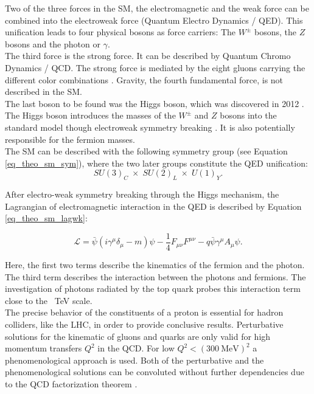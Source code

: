 Two of the three forces in the SM, the electromagnetic and the weak force can be combined into the electroweak force (Quantum Electro Dynamics / QED). This unification leads to four physical bosons as force carriers: The $W^\pm$ bosons, the $Z$ bosons and the photon or $\gamma$. \\
The third force is the strong force. It can be described by Quantum Chromo Dynamics / QCD. The strong force is mediated by the eight gluons carrying the different color combinations \cite{Politzer:1974fr}. Gravity, the fourth fundamental force, is not described in the SM.\\ 
The last boson to be found was the Higgs boson, which was discovered in 2012 \cite{Aad:2012tfa,Chatrchyan:2012ufa}. The Higgs boson introduces the masses of the $W^\pm$ and $Z$ bosons into the standard model though electroweak symmetry breaking \cite{Salam:1968rm,Weinberg:1967tq,Glashow:1961tr}. It is also potentially responsible for the fermion masses. \\
The SM can be described with the following symmetry group (see Equation \ref{eq_theo_sm_sym}), where the two later groups constitute the QED unification:
\begin{equation}
SU(3)_C \; \times \; SU(2)_L \; \times \; U(1)_Y.
\label{eq_theo_sm_sym}
\end{equation}

After electro-weak symmetry breaking through the Higgs mechanism, the Lagrangian of electromagnetic interaction in the QED is described by Equation \ref{eq_theo_sm_lagwk}:

\begin{equation}
\mathcal{L} = \bar{\psi} (i \gamma^\mu \delta_\mu - m) \psi - \frac{1}{4} F_{\mu \nu} F^{\mu \nu} - q \bar{\psi} \gamma^\mu A_\mu \psi.
\label{eq_theo_sm_lagwk}
\end{equation}

Here, the first two terms describe the kinematics of the fermion and the photon. The third term describes the interaction between the photons and fermions. The investigation of photons radiated by the top quark probes this interaction term close to the \SI{}{\tera \electronvolt} scale.\\
The precise behavior of the constituents of a proton is essential for hadron colliders, like the LHC, in order to provide conclusive results. Perturbative solutions for the kinematic of gluons and quarks are only valid for high momentum transfers $Q^2$ in the QCD. For low $Q^2< (\SI{300}{\mega \electronvolt})^2$ a phenomenological approach is used. Both of the perturbative and the phenomenological solutions can be convoluted without further dependencies due to the QCD factorization theorem \cite{Collins:1987pm}.\\

